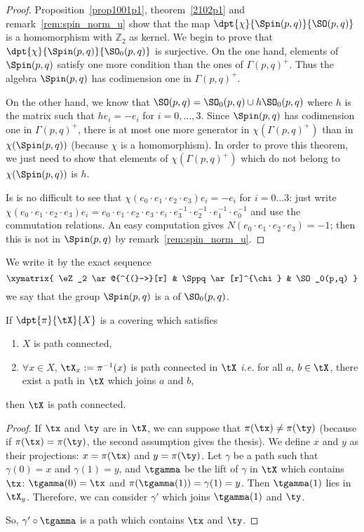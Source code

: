 \begin{proof}
Proposition~\ref{prop1001p1}, theorem~\ref{2102p1} and remark~\ref{rem:spin_norm_u} show that the map $\dpt{\chi}{\Spin(p,q)}{\SO(p,q)}$ is a homomorphism with $\mathbb{Z}_2$ as kernel. We begin to prove that $\dpt{\chi}{\Spin(p,q)}{\SO_0(p,q)}$ is surjective. On the one hand, elements of $\Spin(p,q)$ satisfy one more condition than the ones of $\Gamma(p,q)^+$. Thus the algebra $\Spin(p,q)$ has codimension one in $\Gamma(p,q)^+$.

On the other hand, we know that $\SO(p,q)=\SO_0(p,q)\cup h\SO_0(p,q)$ where $h$ is the matrix such that $he_i=-e_i$ for $i=0,\ldots,3$. Since $\Spin(p,q)$ has codimension one in $\Gamma(p,q)^+$, there is at most one more generator in $\chi(\Gamma(p,q)^+)$ than in $\chi(\Spin(p,q))$ (because $\chi$ is a homomorphism). In order to prove this theorem, we just need to show that elements of $\chi(\Gamma(p,q)^+)$ which do not belong to $\chi(\Spin(p,q))$ is $h$.

Is is no difficult to see that $\chi(e_0\cdot e_1\cdot e_2\cdot e_3)e_i=-e_i$ for $i=0\ldots 3$: just write
$\chi(e_0\cdot e_1\cdot e_2\cdot e_3)e_i=e_0\cdot e_1\cdot e_2\cdot e_3\cdot e_i\cdot e_3^{-1}\cdot e_2^{-1}\cdot e_1^{-1}\cdot e_0^{-1}$ and use the commutation relations. An easy computation gives
$N(e_0\cdot e_1\cdot e_2\cdot e_3)=-1$; then this is not in $\Spin(p,q)$ by remark~\ref{rem:spin_norm_u}.
\end{proof}

We write it by the exact sequence
\begin{equation}
 \xymatrix{
    \eZ_2  \ar@{^{(}->}[r] & \Sppq \ar[r]^{\chi} & \SO_0(p,q)
  }
\end{equation}
we say that the group $\Spin(p,q)$ is a  of $\SO_0(p,q)$.

\begin{lemma}
If $\dpt{\pi}{\tX}{X}$ is a covering which satisfies

\begin{enumerate}
\item $X$ is path connected,
\item $\forall x\in X$, $\tX_x:=\pi^{-1}(x)$ is path connected in $\tX$ \emph{i.e.} for all $a$, $b\in \tX$, there exist a path in $\tX$ which joins $a$ and $b$,
\end{enumerate}
then $\tX$ is path connected.
\label{lem_cov_path_con}
\end{lemma}
\begin{proof}
If $\tx$ and $\ty$ are in $\tX$, we can suppose that $\pi(\tx)\neq\pi(\ty)$ (because if $\pi(\tx)=\pi(\ty)$, the second assumption gives the thesis). We define $x$ and $y$ as their projections: $x=\pi(\tx)$ and $y=\pi(\ty)$. Let $\gamma$ be a path such that $\gamma(0)=x$ and $\gamma(1)=y$, and $\tgamma$ be the lift of $\gamma$ in $\tX$ which contains $\tx$: $\tgamma(0)=\tx$ and $\pi(\tgamma(1))=\gamma(1)=y$. Then $\tgamma(1)$ lies in $\tX_y$. Therefore, we can consider $\gamma'$ which joins $\tgamma(1)$ and $\ty$.

So, $\gamma'\circ\tgamma$ is a path which contains $\tx$ and $\ty$.
\end{proof}


